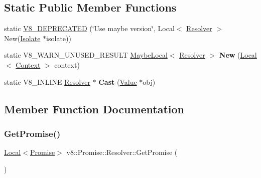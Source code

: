 \subsection*{Static Public Member Functions}
\begin{DoxyCompactItemize}
\item 
static \mbox{\hyperlink{classv8_1_1Promise_1_1Resolver_a67d85fe4756337758692d01f926043cb}{V8\+\_\+\+D\+E\+P\+R\+E\+C\+A\+T\+ED}} (\char`\"{}Use maybe version\char`\"{}, Local$<$ \mbox{\hyperlink{classv8_1_1Promise_1_1Resolver}{Resolver}} $>$ New(\mbox{\hyperlink{classv8_1_1Isolate}{Isolate}} $\ast$isolate))
\item 
\mbox{\label{classv8_1_1Promise_1_1Resolver_af2290c10e43fcde230ea7a79b9128b0e}} 
static V8\+\_\+\+W\+A\+R\+N\+\_\+\+U\+N\+U\+S\+E\+D\+\_\+\+R\+E\+S\+U\+LT \mbox{\hyperlink{classv8_1_1MaybeLocal}{Maybe\+Local}}$<$ \mbox{\hyperlink{classv8_1_1Promise_1_1Resolver}{Resolver}} $>$ {\bfseries New} (\mbox{\hyperlink{classv8_1_1Local}{Local}}$<$ \mbox{\hyperlink{classv8_1_1Context}{Context}} $>$ context)
\item 
\mbox{\label{classv8_1_1Promise_1_1Resolver_ab2b541cb210158ed0c757c8b7dc46279}} 
static V8\+\_\+\+I\+N\+L\+I\+NE \mbox{\hyperlink{classv8_1_1Promise_1_1Resolver}{Resolver}} $\ast$ {\bfseries Cast} (\mbox{\hyperlink{classv8_1_1Value}{Value}} $\ast$obj)
\end{DoxyCompactItemize}


\subsection{Member Function Documentation}
\mbox{\label{classv8_1_1Promise_1_1Resolver_a41fd1ffef546a62e363a639935fc8ae3}} 
\subsubsection{\texorpdfstring{Get\+Promise()}{GetPromise()}}
{\footnotesize\ttfamily \mbox{\hyperlink{classv8_1_1Local}{Local}}$<$\mbox{\hyperlink{classv8_1_1Promise}{Promise}}$>$ v8\+::\+Promise\+::\+Resolver\+::\+Get\+Promise (\begin{DoxyParamCaption}{ }\end{DoxyParamCaption})}


